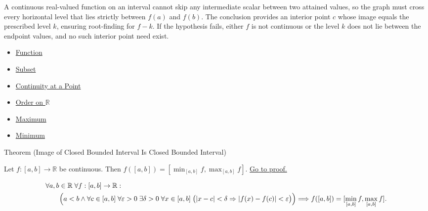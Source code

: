 \begin{remark*}[Interpretation]
A continuous real-valued function on an interval cannot skip any intermediate scalar between two attained values, so the graph must cross every horizontal level that lies strictly between $f(a)$ and $f(b)$. The conclusion provides an interior point $c$ whose image equals the prescribed level $k$, ensuring root-finding for $f-k$. If the hypothesis fails, either $f$ is not continuous or the level $k$ does not lie between the endpoint values, and no such interior point need exist.
\end{remark*}

\begin{dependencies}
\begin{itemize}
  \item \hyperref[def:function]{Function}
  \item \hyperref[def:subset]{Subset}
  \item \hyperref[def:continuous-at-point]{Continuity at a Point}
  \item \hyperref[def:order-on-r]{Order on $\mathbb{R}$}
  \item \hyperref[def:maximum]{Maximum}
  \item \hyperref[def:minimum]{Minimum}
\end{itemize}
\end{dependencies}

\begin{theorembox}{Theorem (Image of Closed Bounded Interval Is Closed Bounded Interval)}
\begin{theorem}
\label{thm:image-of-closed-bounded-interval}
Let $f:[a,b]\to\mathbb{R}$ be continuous. Then $f([a,b])=[\min_{[a,b]} f,\max_{[a,b]} f]$.
\hyperref[prf:image-of-closed-bounded-interval]{Go to proof.}
\end{theorem}
\end{theorembox}

\begin{remark*}
\[
\begin{aligned}
&\forall a,b\in\mathbb{R}\;\forall f:[a,b]\to\mathbb{R}:\\
&\qquad
\Bigl(a<b \land
\forall c\in[a,b]\;\forall \varepsilon>0\;\exists \delta>0\;\forall x\in[a,b]\;
\bigl(|x-c|<\delta\Rightarrow |f(x)-f(c)|<\varepsilon\bigr)\Bigr)
\Longrightarrow
f([a,b])=[\min_{[a,b]} f,\max_{[a,b]} f].
\end{aligned}
\]
\end{remark*}

